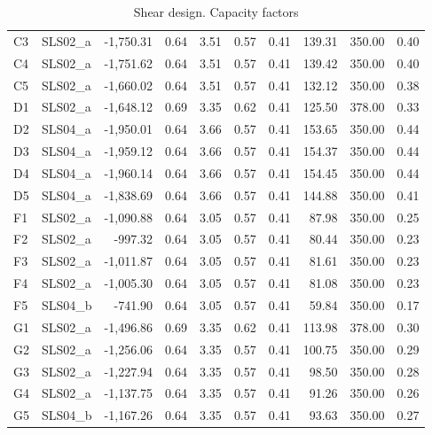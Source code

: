 \begin{table}
\begin{center}
\begin{scriptsize}
\begin{tabular}{|l|l|r|r|r|r|r|r|r|r|}
 C3 &  SLS02\_a & -1,750.31 & 0.64 & 3.51 & 0.57 & 0.41 & 139.31 & 350.00 & 0.40\\
 C4 &  SLS02\_a & -1,751.62 & 0.64 & 3.51 & 0.57 & 0.41 & 139.42 & 350.00 & 0.40\\
 C5 &  SLS02\_a & -1,660.02 & 0.64 & 3.51 & 0.57 & 0.41 & 132.12 & 350.00 & 0.38\\
 D1 &  SLS02\_a & -1,648.12 & 0.69 & 3.35 & 0.62 & 0.41 & 125.50 & 378.00 & 0.33\\
 D2 &  SLS04\_a & -1,950.01 & 0.64 & 3.66 & 0.57 & 0.41 & 153.65 & 350.00 & 0.44\\
 D3 &  SLS04\_a & -1,959.12 & 0.64 & 3.66 & 0.57 & 0.41 & 154.37 & 350.00 & 0.44\\
 D4 &  SLS04\_a & -1,960.14 & 0.64 & 3.66 & 0.57 & 0.41 & 154.45 & 350.00 & 0.44\\
 D5 &  SLS04\_a & -1,838.69 & 0.64 & 3.66 & 0.57 & 0.41 & 144.88 & 350.00 & 0.41\\
 F1 &  SLS02\_a & -1,090.88 & 0.64 & 3.05 & 0.57 & 0.41 & 87.98 & 350.00 & 0.25\\
 F2 &  SLS02\_a & -997.32 & 0.64 & 3.05 & 0.57 & 0.41 & 80.44 & 350.00 & 0.23\\
 F3 &  SLS02\_a & -1,011.87 & 0.64 & 3.05 & 0.57 & 0.41 & 81.61 & 350.00 & 0.23\\
 F4 &  SLS02\_a & -1,005.30 & 0.64 & 3.05 & 0.57 & 0.41 & 81.08 & 350.00 & 0.23\\
 F5 &  SLS04\_b & -741.90 & 0.64 & 3.05 & 0.57 & 0.41 & 59.84 & 350.00 & 0.17\\
 G1 &  SLS02\_a & -1,496.86 & 0.69 & 3.35 & 0.62 & 0.41 & 113.98 & 378.00 & 0.30\\
 G2 &  SLS02\_a & -1,256.06 & 0.64 & 3.35 & 0.57 & 0.41 & 100.75 & 350.00 & 0.29\\
 G3 &  SLS02\_a & -1,227.94 & 0.64 & 3.35 & 0.57 & 0.41 & 98.50 & 350.00 & 0.28\\
 G4 &  SLS02\_a & -1,137.75 & 0.64 & 3.35 & 0.57 & 0.41 & 91.26 & 350.00 & 0.26\\
 G5 &  SLS04\_b & -1,167.26 & 0.64 & 3.35 & 0.57 & 0.41 & 93.63 & 350.00 & 0.27\\
\hline
  \end{tabular}
  \end{scriptsize}
\end{center}
\caption{Shear design. Capacity factors}\label{tb_footings_shear_design}
\end{table}


